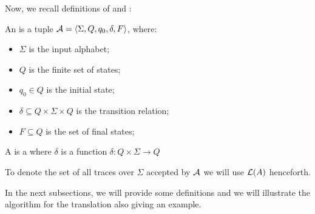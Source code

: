 Now, we recall definitions of \NFA and \DFA:
\begin{definition}\label{nfa}
An \NFA is a tuple $\mathcal{A} = \langle \Sigma, Q, q_0 , \delta, F \rangle$, where:
\begin{itemize}		
\item $\Sigma$ is the input alphabet;
\item $Q$ is the finite set of states;
\item $q_0 \in Q$ is the initial state;
\item $\delta \subseteq Q \times \Sigma \times Q$ is the transition relation;
\item $F \subseteq Q$ is the set of final states;
\end{itemize}
\end{definition}
\begin{definition}
A \DFA is a \NFA where $\delta$ is a function $\delta: Q \times \Sigma \to Q$
\end{definition}
To denote the set of all traces over $\Sigma$ accepted by $\mathcal{A}$ we will use $\mathcal{L}(A)$ henceforth.

In the next subsections, we will provide some definitions and we will illustrate the algorithm for the translation also giving an example.
